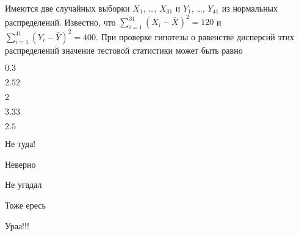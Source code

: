 
\begin{question}
Имеются две случайных выборки \(X_1\), \ldots, \(X_{31}\) и \(Y_1\),
\ldots, \(Y_{41}\) из нормальных распределений. Известно, что
\(\sum_{i=1}^{31}(X_i - \bar X)^2 = 120\) и
\(\sum_{i=1}^{41}(Y_i - \bar Y)^2 = 400\). При проверке гипотезы о
равенстве дисперсий этих распределений значение тестовой статистики
может быть равно
\begin{answerlist}
  \item \(0.3\)
  \item \(2.52\)
  \item \(2\)
  \item \(3.33\)
  \item \(2.5\)
\end{answerlist}
\end{question}

\begin{solution}
\begin{answerlist}
  \item Не туда!
  \item Неверно
  \item Не угадал
  \item Тоже ересь
  \item Ураа!!!
\end{answerlist}
\end{solution}

